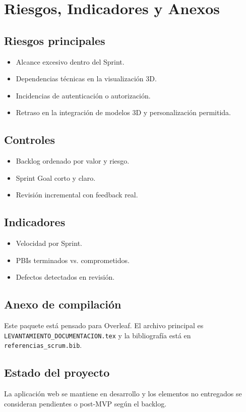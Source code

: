 \section{Riesgos, Indicadores y Anexos}
\subsection{Riesgos principales}
\begin{itemize}[leftmargin=*]
    \item Alcance excesivo dentro del Sprint.
    \item Dependencias t\'ecnicas en la visualizaci\'on 3D.
    \item Incidencias de autenticaci\'on o autorizaci\'on.
    \item Retraso en la integraci\'on de modelos 3D y personalizaci\'on permitida.
\end{itemize}

\subsection{Controles}
\begin{itemize}[leftmargin=*]
    \item Backlog ordenado por valor y riesgo.
    \item Sprint Goal corto y claro.
    \item Revisi\'on incremental con feedback real.
\end{itemize}

\subsection{Indicadores}
\begin{itemize}[leftmargin=*]
    \item Velocidad por Sprint.
    \item PBIs terminados vs. comprometidos.
    \item Defectos detectados en revisi\'on.
\end{itemize}

\subsection{Anexo de compilaci\'on}
Este paquete est\'a pensado para Overleaf. El archivo principal es \texttt{LEVANTAMIENTO_DOCUMENTACION.tex} y la bibliograf\'ia est\'a en \texttt{referencias\_scrum.bib}.

\subsection{Estado del proyecto}
La aplicaci\'on web se mantiene en desarrollo y los elementos no entregados se consideran pendientes o post-MVP seg\'un el backlog.